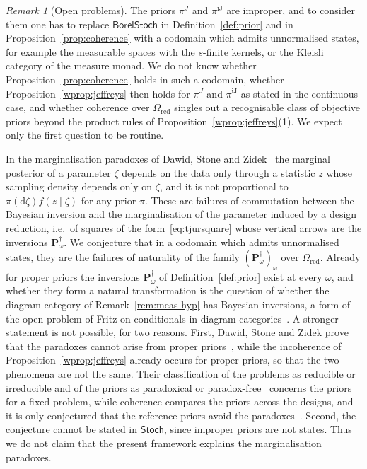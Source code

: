 \documentclass[11pt,a4paper]{article}
\theoremstyle{plain}
\theoremstyle{definition}
\theoremstyle{remark}
\newtheorem{remark}[theorem]{Remark}
\newcommand{\cat}[1]{\mathsf{#1}}
\newcommand{\catO}{\cat{\Omega}}
\newcommand{\Stoch}{\cat{Stoch}}
\newcommand{\BorelStoch}{\cat{BorelStoch}}
\begin{document}
\begin{remark}[Open problems]\label{rem:open}
The priors $\pi^{J}$ and $\pi^{\mathrm{iJ}}$ are improper, and to consider them
one has to replace $\BorelStoch$ in Definition~\ref{def:prior} and in
Proposition~\ref{prop:coherence} with a codomain which admits unnormalised
states, for example the measurable spaces with the $s$-finite kernels, or the
Kleisli category of the measure monad. We do not know whether
Proposition~\ref{prop:coherence} holds in such a codomain, whether
Proposition~\ref{wprop:jeffreys} then holds for $\pi^{J}$ and
$\pi^{\mathrm{iJ}}$ as stated in the continuous case, and whether coherence
over $\catO_{\mathrm{red}}$ singles out a recognisable class of objective
priors beyond the product rules of Proposition~\ref{wprop:jeffreys}(1). We
expect only the first question to be routine.

In the marginalisation paradoxes of Dawid, Stone and
Zidek~\cite[\S1 and Thm.~2.1, p.~198]{dawid_stone_zidek_1973} the marginal
posterior of a parameter $\zeta$ depends on the data only through a statistic
$z$ whose sampling density depends only on $\zeta$, and it is not proportional
to $\pi(\mathrm{d}\zeta)f(z\mid\zeta)$ for any prior $\pi$. These are failures of
commutation between the Bayesian inversion and the marginalisation of the
parameter induced by a design reduction, i.e.\ of squares of the
form~\eqref{eq:tjursquare} whose vertical arrows are the inversions
$\mathbf P^{\dagger}_{\omega}$. We conjecture that in a codomain which admits
unnormalised states, they are the failures of naturality of the family
$(\mathbf P^{\dagger}_{\omega})_{\omega}$ over $\catO_{\mathrm{red}}$.
Already for proper priors the inversions $\mathbf P^{\dagger}_{\omega}$ of
Definition~\ref{def:prior} exist at every $\omega$, and whether they form a
natural transformation is the question of whether the diagram category of
Remark~\ref{rem:meas-hyp} has Bayesian inversions, a form of the open problem
of Fritz on conditionals in diagram
categories~\cite[Problem~11.9]{fritz_synthetic_2020}. A
stronger statement is not possible, for two reasons. First, Dawid, Stone and
Zidek prove that the paradoxes cannot arise from proper
priors~\cite[p.~189 and p.~194, eqs.~(1.20)--(1.23)]{dawid_stone_zidek_1973},
while the incoherence of Proposition~\ref{wprop:jeffreys} already occurs for
proper priors, so that the two phenomena are not the same. Their
classification of the problems as reducible or irreducible and of the priors
as paradoxical or
paradox-free~\cite[p.~208]{dawid_stone_zidek_1973} concerns the priors for a
fixed problem, while coherence compares the priors across the designs, and it
is only conjectured that the reference priors avoid the
paradoxes~\cite[p.~123]{bernardo_reference_1979}. Second, the conjecture
cannot be stated in $\Stoch$, since improper priors are not states. Thus we do
not claim that the present framework explains the marginalisation paradoxes.
\end{remark}
\end{document}
